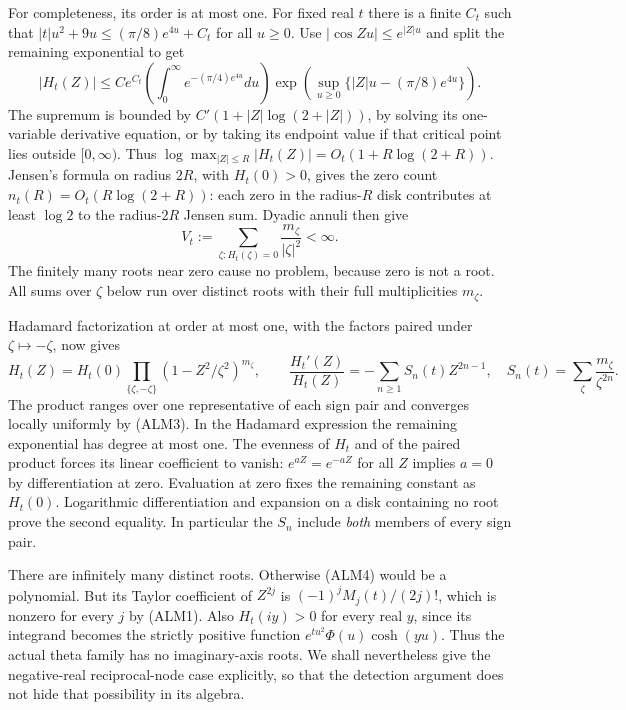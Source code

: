 For completeness, its order is at most one. For fixed real $t$ there
is a finite $C_t$ such that
$|t|u^2+9u\le (\pi/8)e^{4u}+C_t$ for all $u\ge0$.
Use $|\cos Zu|\le e^{|Z|u}$ and split the remaining exponential to get
\[
 |H_t(Z)|\le C e^{C_t}
 \left(\int_0^\infty e^{-(\pi/4)e^{4u}}du\right)
 \exp\!\left(\sup_{u\ge0}\{|Z|u-(\pi/8)e^{4u}\}\right).
\]
The supremum is bounded by $C'(1+|Z|\log(2+|Z|))$, by solving its
one-variable derivative equation, or by taking its endpoint value if
that critical point lies outside $[0,\infty)$. Thus
$\log\max_{|Z|\le R}|H_t(Z)|=O_t(1+R\log(2+R))$.
Jensen's formula on radius $2R$, with $H_t(0)>0$, gives the zero count
$n_t(R)=O_t(R\log(2+R))$: each zero in the radius-$R$ disk contributes
at least $\log2$ to the radius-$2R$ Jensen sum. Dyadic annuli then give
\begin{equation}\tag{ALM3}
 V_t:=\sum_{\zeta:H_t(\zeta)=0}\frac{m_\zeta}{|\zeta|^2}<\infty.
\end{equation}
The finitely many roots near zero cause no problem, because zero is
not a root. All sums over $\zeta$ below run over distinct roots with
their full multiplicities $m_\zeta$.

Hadamard factorization at order at most one, with the factors paired
under $\zeta\mapsto-\zeta$, now gives
\begin{equation}\tag{ALM4}
 H_t(Z)=H_t(0)\prod_{\{\zeta,-\zeta\}}
                  (1-Z^2/\zeta^2)^{m_\zeta},\qquad
 \frac{H_t'(Z)}{H_t(Z)}=-\sum_{n\ge1}S_n(t)Z^{2n-1},
 \quad S_n(t)=\sum_\zeta\frac{m_\zeta}{\zeta^{2n}}.
\end{equation}
The product ranges over one representative of each sign pair and
converges locally uniformly by (ALM3). In the Hadamard expression the
remaining exponential has degree at most one. The evenness of $H_t$
and of the paired product forces its linear coefficient to vanish:
$e^{aZ}=e^{-aZ}$ for all $Z$ implies $a=0$ by differentiation at zero.
Evaluation at zero fixes the remaining constant as $H_t(0)$.
Logarithmic differentiation and expansion on a disk containing no
root prove the second equality. In particular the $S_n$ include
\emph{both} members of every sign pair.

There are infinitely many distinct roots. Otherwise (ALM4) would be
a polynomial. But its Taylor coefficient of $Z^{2j}$ is
$(-1)^jM_j(t)/(2j)!$, which is nonzero for every $j$ by (ALM1).
Also $H_t(iy)>0$ for every real $y$, since its integrand becomes the
strictly positive function $e^{tu^2}\Phi(u)\cosh(yu)$. Thus the actual
theta family has no imaginary-axis roots. We shall nevertheless give
the negative-real reciprocal-node case explicitly, so that the
detection argument does not hide that possibility in its algebra.

